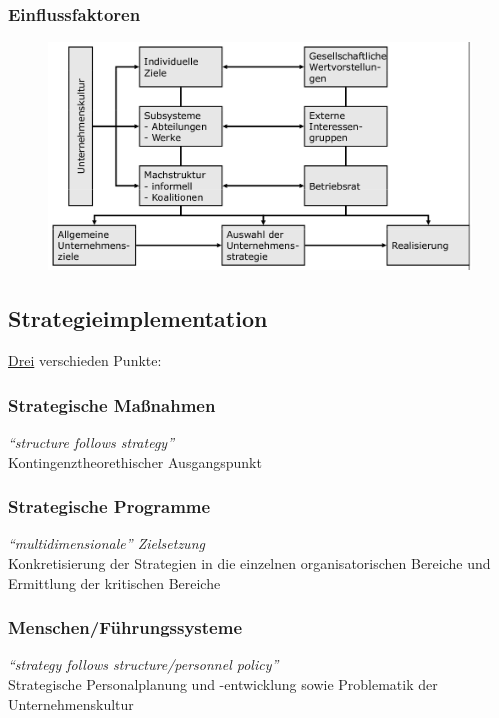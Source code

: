 \documentclass[a4paper,11pt, twoside]{article}
\begin{document}
\subsubsection*{Einflussfaktoren}

\begin{figure}[h]
 \begin{center}
   \includegraphics[scale=0.3]{bilder/strategische_einflussfaktoren.png}
 \end{center}
\end{figure}

\subsection{Strategieimplementation}
\underline{Drei} verschieden Punkte:

\subsubsection*{Strategische Maßnahmen}
\textit{"`structure follows strategy"'}\\
Kontingenztheorethischer Ausgangspunkt


\subsubsection*{Strategische Programme}
\textit{"`multidimensionale"' Zielsetzung}\\
Konkretisierung der Strategien in die einzelnen organisatorischen Bereiche und Ermittlung der kritischen Bereiche


\subsubsection*{Menschen/Führungssysteme}
\textit{"`strategy follows structure/personnel policy"'}\\
Strategische Personalplanung und -entwicklung sowie Problematik der Unternehmenskultur
\end{document}
